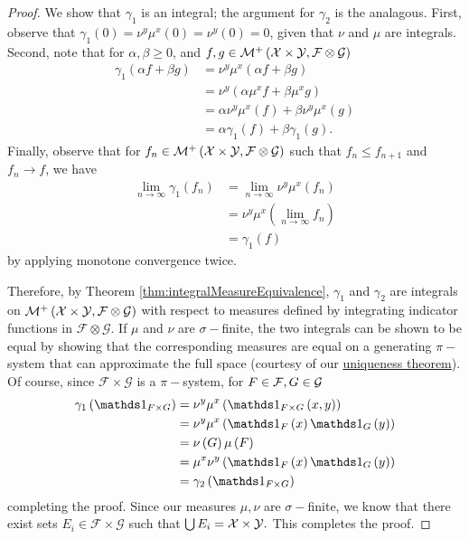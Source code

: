 \begin{proof}
We show that $\gamma_{1}$ is an integral; the argument for $\gamma_{2}$
is the analagous. First, observe that $\gamma_{1}\left(0\right)=\nu^{y}\mu^{x}\left(0\right)=\nu^{y}\left(0\right)=0$,
given that $\nu$ and $\mu$ are integrals. Second, note that for
$\alpha,\beta\geq0$, and $f,g\in\mathcal{M}^{+}\left(\mathcal{X}\times\mathcal{Y},\mathcal{F}\otimes\mathcal{G}\right)$
\begin{align*}
\gamma_{1}\left(\alpha f+\beta g\right) & =\nu^{y}\mu^{x}\left(\alpha f+\beta g\right)\\
 & =\nu^{y}\left(\alpha\mu^{x}f+\beta\mu^{x}g\right)\\
 & =\alpha\nu^{y}\mu^{x}\left(f\right)+\beta\nu^{y}\mu^{x}\left(g\right)\\
 & =\alpha\gamma_{1}\left(f\right)+\beta\gamma_{1}\left(g\right).
\end{align*}
Finally, observe that for $f_{n}\in\mathcal{M}^{+}\left(\mathcal{X}\times\mathcal{Y},\mathcal{F}\otimes\mathcal{G}\right)$
such that $f_{n}\leq f_{n+1}$ and $f_{n}\to f$, we have
\begin{align*}
\lim_{n\to\infty}\gamma_{1}\left(f_{n}\right) & =\lim_{n\to\infty}\nu^{y}\mu^{x}\left(f_{n}\right)\\
 & =\nu^{y}\mu^{x}\left(\lim_{n\to\infty}f_{n}\right)\\
 & =\gamma_{1}\left(f\right)
\end{align*}
by applying monotone convergence twice.

Therefore, by Theorem \ref{thm:integralMeasureEquivalence}, $\gamma_{1}$
and $\gamma_{2}$ are integrals on $\mathcal{M}^{+}\left(\mathcal{X}\times\mathcal{Y},\mathcal{F}\otimes\mathcal{G}\right)$
with respect to measures defined by integrating indicator functions
in $\mathcal{F\otimes\mathcal{G}}.$ If $\mu$ and $\nu$ are $\sigma-$finite,
the two integrals can be shown to be equal by showing that the corresponding
measures are equal on a generating $\pi-$system that can approximate
the full space (courtesy of our \hyperref[thm:uniquenessMeasures]{uniqueness theorem}).
Of course, since $\mathcal{F\times\mathcal{G}}$ is a $\pi-$system,
for $F\in\mathcal{F},G\in\mathcal{G}$
\begin{align*}
\gamma_{1}\left(\indicate_{F\times G}\right) & =\nu^{y}\mu^{x}\left(\indicate_{F\times G}\left(x,y\right)\right)\\
 & =\nu^{y}\mu^{x}\left(\indicate_{F}\left(x\right)\indicate_{G}\left(y\right)\right)\\
 & =\nu\left(G\right)\mu\left(F\right)\\
 & =\mu^{x}\nu^{y}\left(\indicate_{F}\left(x\right)\indicate_{G}\left(y\right)\right)\\
 & =\gamma_{2}\left(\indicate_{F\times G}\right)
\end{align*}
completing the proof. Since our measures $\mu,\nu$ are $\sigma-$finite,
we know that there exist sets $E_{i}\in\mathcal{F\times\mathcal{G}}$
such that $\bigcup E_{i}=\mathcal{X}\times\mathcal{Y}.$ This completes the
proof.
\end{proof}
